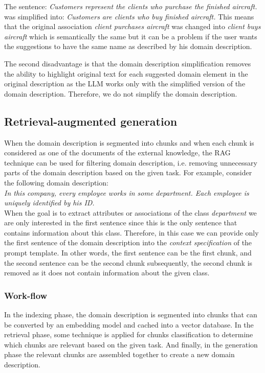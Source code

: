 \noindent{}The sentence: \textit{Customers represent the clients who purchase the finished aircraft.} was simplified into: \textit{Customers are clients who buy finished aircraft.} This means that the original association \textit{client purchases aircraft} was changed into \textit{client buys aircraft} which is semantically the same but it can be a problem if the user wants the suggestions to have the same name as described by his domain description.

The second disadvantage is that the domain description simplification removes the ability to highlight original text for each suggested domain element in the original description as the LLM works only with the simplified version of the domain description. Therefore, we do not simplify the domain description.


\subsection{Retrieval-augmented generation}

When the domain description is segmented into chunks and when each chunk is considered as one of the documents of the external knowledge, the RAG technique can be used for filtering domain description, i.e. removing unnecessary parts of the domain description based on the given task. For example, consider the following domain description: \\

\noindent{}\textit{In this company, every employee works in some department. Each employee is uniquely identified by his ID.}\\

\noindent{}When the goal is to extract attributes or associations of the class \textit{department} we are only interested in the first sentence since this is the only sentence that contains information about this class. Therefore, in this case we can provide only the first sentence of the domain description into the \emph{context specification} of the prompt template. In other words, the first sentence can be the first chunk, and the second sentence can be the second chunk subsequently, the second chunk is removed as it does not contain information about the given class.


\subsubsection{Work-flow}

In the indexing phase, the domain description is segmented into chunks that can be converted by an embedding model and cached into a vector database. In the retrieval phase, some technique is applied for chunks classification to determine which chunks are relevant based on the given task. And finally, in the generation phase the relevant chunks are assembled together to create a new domain description.


